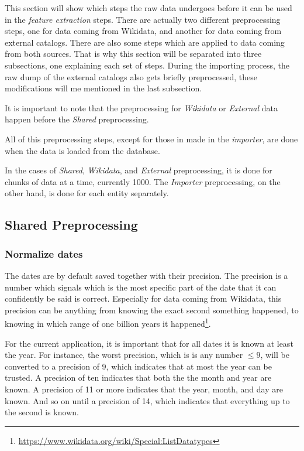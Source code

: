 \documentclass[epsfig,a4paper,11pt,titlepage,twoside,openany]{book}
\newcommand{\footurl}[1]{\footnote{\url{#1}}}
\begin{document}
This section will show which steps the raw data undergoes before it can be used in the \textit{feature extraction} steps. There are actually two different preprocessing steps, one for data coming from Wikidata, and another for data coming from external catalogs. There are also some steps which are applied to data coming from both sources. That is why this section will be separated into three subsections, one explaining each set of steps. During the importing process, the raw dump of the external catalogs also gets briefly preprocessed, these modifications will me mentioned in the last subsection.

It is important to note that the preprocessing for \textit{Wikidata} or \textit{External} data happen before the \textit{Shared} preprocessing. 

All of this preprocessing steps, except for those in made in the \textit{importer}, are done when the data is loaded from the database.

In the cases of \textit{Shared}, \textit{Wikidata}, and \textit{External} preprocessing, it is done for chunks of data at a time, currently 1000. The \textit{Importer} preprocessing, on the other hand, is done for each entity separately. 


\subsection{Shared Preprocessing}
\label{sec:data-preprocessing-shared}

\subsubsection{Normalize dates}
\label{sec:data-preprocessiong-date-normalization}

The dates are by default saved together with their precision. The precision is a number which signals which is the most specific part of the date that it can confidently be said is correct. Especially for data coming from Wikidata, this precision can be anything from knowing the exact second something happened, to knowing in which range of one billion years it happened\footurl{https://www.wikidata.org/wiki/Special:ListDatatypes}.

For the current application, it is important that for all dates it is known at least the year. For instance, the worst precision, which is is any number $\leq 9$, will be converted to a precision of 9, which indicates that at most the year can be trusted. A precision of ten indicates that both the the month and year are known. A precision of 11 or more indicates that the year, month, and day are known. And so on until a precision of 14, which indicates that everything up to the second is known. 
\end{document}
